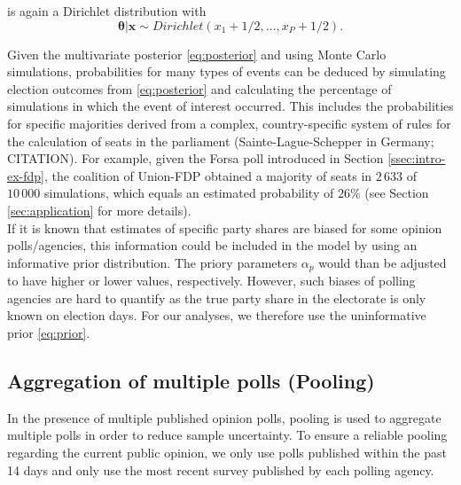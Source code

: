 \documentclass[smallcondensed]{svjour3}     %
\begin{document}
is again a Dirichlet distribution with
\begin{equation}\label{eq:posterior}
\boldsymbol{\theta}|\mathbf{x} \sim Dirichlet(x_1 + 1/2,\ldots, x_P + 1/2).
\end{equation}

Given the multivariate posterior \eqref{eq:posterior} and using Monte Carlo
simulations, probabilities for many types of events can be deduced by simulating
election outcomes from \eqref{eq:posterior} and calculating the percentage of
simulations in which the event of interest occurred. This includes the
probabilities for specific majorities derived from a complex, country-specific
system of rules for the calculation of seats in the parliament
(Sainte-Lague-Schepper in Germany; CITATION). For example, given the Forsa poll
introduced in Section \ref{ssec:intro-ex-fdp}, the coalition of Union-FDP
obtained a majority of seats in $2\,633$ of $10\,000$ simulations, which equals
an estimated probability of $26\%$ (see Section \ref{sec:application} for
more details).\\

If it is known that estimates of specific party shares are biased for some opinion
polls/agencies, this information could be included in the model by using an
informative prior distribution. The priory parameters $\alpha_p$ would than
be adjusted to have higher or lower values, respectively.
However, such biases of polling agencies are hard to quantify as the true party
share in the electorate is only known on election days. For our analyses, we
therefore use the uninformative prior \eqref{eq:prior}.

\subsection{Aggregation of multiple polls (Pooling)} \label{ssec:pooling}
In the presence of multiple published opinion polls, pooling is used to
aggregate multiple polls in order to reduce sample uncertainty.
To ensure a reliable pooling regarding the current public opinion,
we only use polls published within the past 14 days and only use the
most recent survey published by each polling agency.\\
\end{document}

